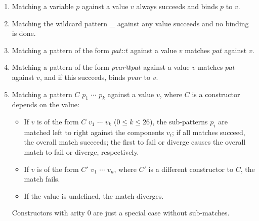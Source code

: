 \begin{enumerate}
\item Matching a variable $p$ against a value $v$ always succeeds and binds $p$ to $v$.
\item Matching the wildcard pattern \_ against any value succeeds and no binding is done.
\item Matching a pattern of the form $pat$::$t$ against a value $v$ matches $pat$ against $v$.
\item Matching a pattern of the form $pvar$@$pat$ against a value $v$ matches $pat$ against $v$, and if this succeeds, binds $pvar$ to $v$.
\item Matching a pattern $C$ $p_1$ $\cdots$ $p_k$ against a value $v$, where $C$ is a constructor depends on the value:
\begin{itemize}
\item If $v$ is of the form $C$ $v_1$ $\cdots$ $v_k$ ($0\le k\le 26$), the sub-patterns $p_i$ are matched left to right against the components $v_i$; if all matches succeed, the overall match succeeds; the first to fail or diverge causes the overall match to fail or diverge, respectively.
\item If $v$ is of the form $C'$ $v_1$ $\cdots$ $v_n$, where $C'$ is a different constructor to $C$, the match fails.
\item If the value is undefined, the match diverges.
\end{itemize}
Constructors with arity 0 are just a special case without sub-matches.


\end{enumerate}
